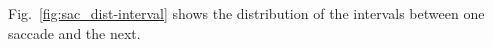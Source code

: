 Fig.~\ref{fig:sac_dist-interval} shows the distribution of the intervals between one saccade and the next. 
